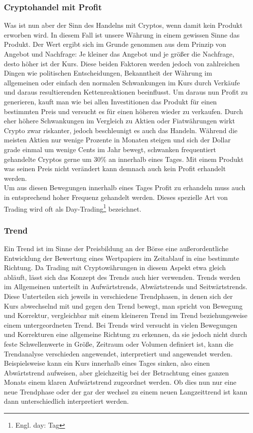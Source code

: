 \documentclass[12pt]{article}
\begin{document}
	\subsubsection{Cryptohandel mit Profit}
		Was ist nun aber der Sinn des Handelns mit Cryptos, wenn damit kein Produkt erworben wird. In diesem Fall ist unsere Währung in einem gewissen Sinne das Produkt. Der Wert ergibt sich im Grunde genommen aus dem Prinzip von Angebot und Nachfrage: Je kleiner das Angebot und je größer die Nachfrage, desto höher ist der Kurs. Diese beiden Faktoren werden jedoch von zahlreichen Dingen wie politischen Entscheidungen, Bekanntheit der Währung im allgemeinen oder einfach den normalen Schwankungen im Kurs durch Verkäufe und daraus resultierenden Kettenreaktionen beeinflusst. Um daraus nun Profit zu generieren, kauft man wie bei allen Investitionen das Produkt für einen bestimmten Preis und versucht es für einen höheren wieder zu verkaufen. Durch eher höhere Schwankungen im Vergleich zu Aktien oder Fiatwährungen wirkt Crypto zwar riskanter, jedoch beschleunigt es auch das Handeln. Während die meisten Aktien nur wenige Prozente in Monaten steigen und sich der Dollar grade einmal um wenige Cents im Jahr bewegt, schwanken frequentiert gehandelte Cryptos gerne um 30\% an innerhalb eines Tages. Mit einem Produkt was seinen Preis nicht verändert kann demnach auch kein Profit erhandelt werden.\\
		Um aus diesen Bewegungen innerhalb eines Tages Profit zu erhandeln muss auch in entsprechend hoher Frequenz gehandelt werden. Dieses spezielle Art von Trading wird oft als Day-Trading\footnote{Engl. day: Tag} bezeichnet.	
	\subsubsection{Trend}
		\glqq Ein Trend ist im Sinne der Preisbildung an der Börse eine außerordentliche Entwicklung der Bewertung eines Wertpapiers im Zeitablauf in eine bestimmte Richtung\grqq{}. Da Trading mit Cryptowährungen in diesem Aspekt etwa gleich abläuft, lässt sich das Konzept des Trends auch hier verwenden. Trends werden im Allgemeinen unterteilt in Aufwärtstrends, Abwärtstrends und Seitwärtstrends. Diese Unterteilen sich jeweils in verschiedene Trendphasen, in denen sich der Kurs abwechselnd mit und gegen den Trend bewegt, man spricht von Bewegung und Korrektur, vergleichbar mit einem kleineren Trend im Trend beziehungsweise einem untergeordneten Trend. Bei Trends wird versucht in vielen Bewegungen und Korrekturen eine allgemeine Richtung zu erkennen, da sie jedoch nicht durch feste Schwellenwerte in Größe, Zeitraum oder Volumen definiert ist, kann die Trendanalyse verschieden angewendet, interpretiert und angewendet werden. Beispielsweise kann ein Kurs innerhalb eines Tages sinken, also einen Abwärtstrend aufweisen, aber gleichzeitig bei der Betrachtung eines ganzen Monats einem klaren Aufwärtstrend zugeordnet werden. Ob dies nun nur eine neue Trendphase oder der gar der wechsel zu einem neuen Langzeittrend ist kann dann unterschiedlich interpretiert werden.
\end{document}

